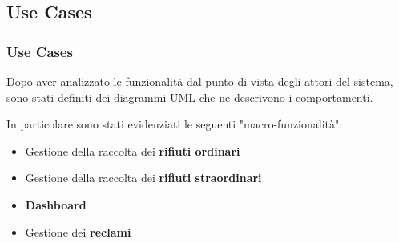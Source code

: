 \subsection{Use Cases}

\begin{frame}
    \frametitle{Use Cases}
    Dopo aver analizzato le funzionalità dal punto di vista degli attori del sistema, sono stati definiti dei
    diagrammi UML che ne descrivono i comportamenti.

    \bigskip

    In particolare sono stati evidenziati le seguenti "macro-funzionalità":
    \begin{itemize}
        \item Gestione della raccolta dei \textbf{rifiuti ordinari}
        \item Gestione della raccolta dei \textbf{rifiuti straordinari}
        \item \textbf{Dashboard}
        \item Gestione dei \textbf{reclami}
    \end{itemize}
\end{frame}
